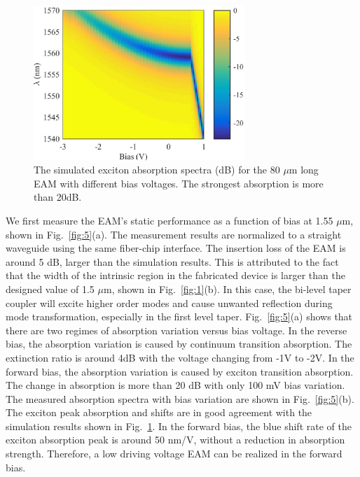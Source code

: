 \documentclass[aip,apl,reprint,a4paper]{revtex4-1}
\begin{document}
\begin{figure}
	\includegraphics[width=8cm]{figure/fig4.eps}%
	\caption{\label{fig:4} The simulated exciton absorption spectra (dB) for the 80 $\mu$m long EAM with different bias voltages. The strongest absorption is more than 20dB.}
\end{figure}


We first measure the EAM’s static performance as a function of bias at 1.55 $\mu$m, shown in Fig.~\ref{fig:5}(a). The measurement results are normalized to a straight waveguide using the same fiber-chip interface. The insertion loss of the EAM is around 5 dB, larger than the simulation results. This is attributed to the fact that the width of the intrinsic region in the fabricated device is larger than the designed value of 1.5 $\mu$m, shown in Fig.~\ref{fig:1}(b). In this case, the bi-level taper coupler will excite higher order modes and cause unwanted reflection during mode transformation, especially in the first level taper.\cite{huang2015ultracompact} Fig.~\ref{fig:5}(a) shows that there are two regimes of absorption variation versus bias voltage. In the reverse bias, the absorption variation is caused by continuum transition absorption. The extinction ratio is around 4dB with the voltage changing from -1V to -2V. In the forward bias, the absorption variation is caused by exciton transition absorption. The change in absorption is more than 20 dB with only 100 mV bias variation. The measured absorption spectra with bias variation are shown in Fig.~\ref{fig:5}(b). The exciton peak absorption and shifts are in good agreement with the simulation results shown in Fig.~\ref{fig:4}. In the forward bias, the blue shift rate of the exciton absorption peak is around 50 nm/V, without a reduction in absorption strength. Therefore, a low driving voltage EAM can be realized in the forward bias.
\end{document}
